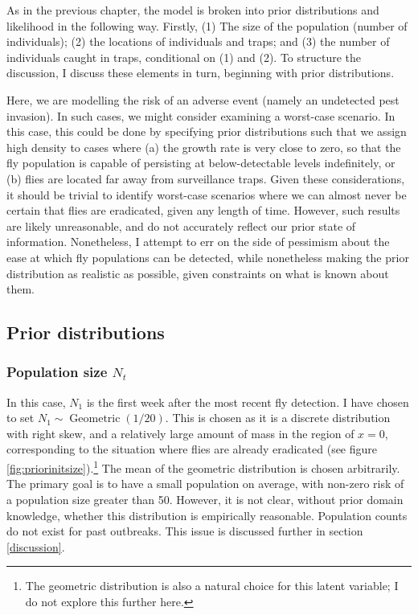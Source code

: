 \documentclass[
  oneside]{book}
\begin{document}
As in the previous chapter, the model is broken into prior distributions and likelihood in the following way. Firstly, (1) The size of the population (number of individuals); (2) the locations of individuals and traps; and (3) the number of individuals caught in traps, conditional on (1) and (2). To structure the discussion, I discuss these elements in turn, beginning with prior distributions.

Here, we are modelling the risk of an adverse event (namely an undetected pest invasion). In such cases, we might consider examining a worst-case scenario. In this case, this could be done by specifying prior distributions such that we assign high density to cases where (a) the growth rate is very close to zero, so that the fly population is capable of persisting at below-detectable levels indefinitely, or (b) flies are located far away from surveillance traps. Given these considerations, it should be trivial to identify worst-case scenarios where we can almost never be certain that flies are eradicated, given any length of time. However, such results are likely unreasonable, and do not accurately reflect our prior state of information. Nonetheless, I attempt to err on the side of pessimism about the ease at which fly populations can be detected, while nonetheless making the prior distribution as realistic as possible, given constraints on what is known about them.

\hypertarget{prior-distributions}{%
\subsection{Prior distributions}\label{prior-distributions}}

\hypertarget{popn-size}{%
\subsubsection{\texorpdfstring{Population size \(N_t\)}{Population size N\_t}}\label{popn-size}}

In this case, \(N_1\) is the first week after the most recent fly detection. I have chosen to set \(N_1 \sim \operatorname{Geometric}(1/20)\). This is chosen as it is a discrete distribution with right skew, and a relatively large amount of mass in the region of \(x = 0\), corresponding to the situation where flies are already eradicated (see figure \ref{fig:priorinitsize}).\footnote{The geometric distribution is also a natural choice for this latent variable; I do not explore this further here.} The mean of the geometric distribution is chosen arbitrarily. The primary goal is to have a small population on average, with non-zero risk of a population size greater than 50. However, it is not clear, without prior domain knowledge, whether this distribution is empirically reasonable. Population counts do not exist for past outbreaks. This issue is discussed further in section \ref{discussion}.
\end{document}
